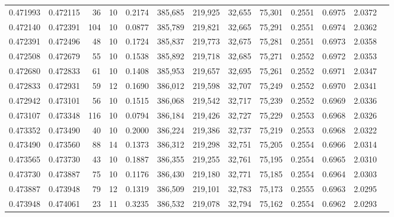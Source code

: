 \begin{tabular}{rrrrrrrrrrrrr}
0.471993 & 0.472115 &    36 &  10 &                                     0.2174 & 385,685 & 219,925 &  32,655 &  75,301 & 0.2551 & 0.6975 & 2.0372 \\
0.472140 & 0.472391 &   104 &  10 &                                     0.0877 & 385,789 & 219,821 &  32,665 &  75,291 & 0.2551 & 0.6974 & 2.0362 \\
0.472391 & 0.472496 &    48 &  10 &                                     0.1724 & 385,837 & 219,773 &  32,675 &  75,281 & 0.2551 & 0.6973 & 2.0358 \\
0.472508 & 0.472679 &    55 &  10 &                                     0.1538 & 385,892 & 219,718 &  32,685 &  75,271 & 0.2552 & 0.6972 & 2.0353 \\
0.472680 & 0.472833 &    61 &  10 &                                     0.1408 & 385,953 & 219,657 &  32,695 &  75,261 & 0.2552 & 0.6971 & 2.0347 \\
0.472833 & 0.472931 &    59 &  12 &                                     0.1690 & 386,012 & 219,598 &  32,707 &  75,249 & 0.2552 & 0.6970 & 2.0341 \\
0.472942 & 0.473101 &    56 &  10 &                                     0.1515 & 386,068 & 219,542 &  32,717 &  75,239 & 0.2552 & 0.6969 & 2.0336 \\
0.473107 & 0.473348 &   116 &  10 &                                     0.0794 & 386,184 & 219,426 &  32,727 &  75,229 & 0.2553 & 0.6968 & 2.0326 \\
0.473352 & 0.473490 &    40 &  10 &                                     0.2000 & 386,224 & 219,386 &  32,737 &  75,219 & 0.2553 & 0.6968 & 2.0322 \\
0.473490 & 0.473560 &    88 &  14 &                                     0.1373 & 386,312 & 219,298 &  32,751 &  75,205 & 0.2554 & 0.6966 & 2.0314 \\
0.473565 & 0.473730 &    43 &  10 &                                     0.1887 & 386,355 & 219,255 &  32,761 &  75,195 & 0.2554 & 0.6965 & 2.0310 \\
0.473730 & 0.473887 &    75 &  10 &                                     0.1176 & 386,430 & 219,180 &  32,771 &  75,185 & 0.2554 & 0.6964 & 2.0303 \\
0.473887 & 0.473948 &    79 &  12 &                                     0.1319 & 386,509 & 219,101 &  32,783 &  75,173 & 0.2555 & 0.6963 & 2.0295 \\
0.473948 & 0.474061 &    23 &  11 &                                     0.3235 & 386,532 & 219,078 &  32,794 &  75,162 & 0.2554 & 0.6962 & 2.0293 \\

\end{tabular}
